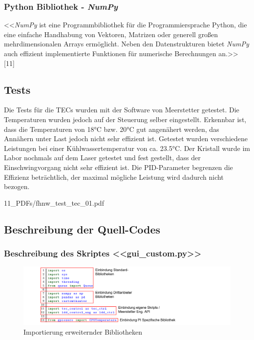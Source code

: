 \begin{appendix}
\subsubsection{Python Bibliothek - \textit{NumPy}}
<<\textit{NumPy} ist eine Programmbibliothek für die Programmiersprache Python, die eine einfache Handhabung von Vektoren, Matrizen oder generell großen mehrdimensionalen Arrays ermöglicht. Neben den Datenstrukturen bietet \textit{NumPy} auch effizient implementierte Funktionen für numerische Berechnungen an.>> [11]

\subsection{Tests}
Die Tests für die TECs wurden mit der Software von Meerstetter getestet. Die Temperaturen wurden jedoch auf der Steuerung selber eingestellt. Erkennbar ist, dass die Temperaturen von 18°C bzw. 20°C gut angenähert werden, das Annähern unter Last jedoch nicht sehr effizient ist. Getestet wurden verschiedene Leistungen bei einer Kühlwassertemperatur von ca. 23.5°C. Der Kristall wurde im Labor nochmals auf dem Laser getestet und fest gestellt, dass der Einschwingvorgang nicht sehr effizient ist. Die PID-Parameter begrenzen die Effizienz beträchtlich, der maximal mögliche Leistung wird dadurch nicht bezogen.


{11_PDFs/fhnw_test_tec_01.pdf}
\begin{landscape}
    \subsection{Beschreibung der Quell-Codes}
\subsubsection{Beschreibung des Skriptes <<gui\_custom.py>>}

\begin{figure}[H]
    \centering
    \includegraphics[scale=0.85]{98_images/src/fhnw_pro6m_quellcode_01.png}
    \caption*{Importierung erweiternder Bibliotheken}
    \label{fig:fhnw_pro6m_quellcode_01}
\end{figure}


\end{landscape}
\end{appendix}
